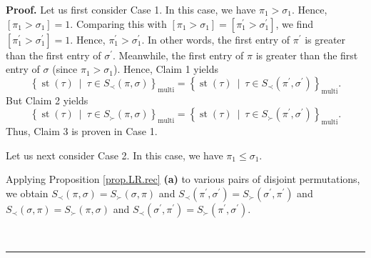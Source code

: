 \documentclass[numbers=enddot,12pt,final,onecolumn,notitlepage]{scrartcl}%
\theoremstyle{definition}
\newenvironment{proof}[1][Proof]{\noindent\textbf{#1.} }{\ \rule{0.5em}{0.5em}}
\begin{document}
\begin{proof}
Let us first consider Case 1. In this case, we have $\pi_{1}>\sigma_{1}$.
Hence, $\left[  \pi_{1}>\sigma_{1}\right]  =1$. Comparing this with $\left[
\pi_{1}>\sigma_{1}\right]  =\left[  \pi_{1}^{\prime}>\sigma_{1}^{\prime
}\right]  $, we find $\left[  \pi_{1}^{\prime}>\sigma_{1}^{\prime}\right]
=1$. Hence, $\pi_{1}^{\prime}>\sigma_{1}^{\prime}$. In other words, the first
entry of $\pi^{\prime}$ is greater than the first entry of $\sigma^{\prime}$.
Meanwhile, the first entry of $\pi$ is greater than the first entry of
$\sigma$ (since $\pi_{1}>\sigma_{1}$). Hence, Claim 1 yields%
\[
\left\{  \operatorname*{st}\left(  \tau\right)  \ \mid\ \tau\in S_{\prec
}\left(  \pi,\sigma\right)  \right\}  _{\operatorname*{multi}}=\left\{
\operatorname*{st}\left(  \tau\right)  \ \mid\ \tau\in S_{\prec}\left(
\pi^{\prime},\sigma^{\prime}\right)  \right\}  _{\operatorname*{multi}}.
\]
But Claim 2 yields%
\[
\left\{  \operatorname*{st}\left(  \tau\right)  \ \mid\ \tau\in S_{\succ
}\left(  \pi,\sigma\right)  \right\}  _{\operatorname*{multi}}=\left\{
\operatorname*{st}\left(  \tau\right)  \ \mid\ \tau\in S_{\succ}\left(
\pi^{\prime},\sigma^{\prime}\right)  \right\}  _{\operatorname*{multi}}.
\]
Thus, Claim 3 is proven in Case 1.

Let us next consider Case 2. In this case, we have $\pi_{1}\leq\sigma_{1}$.

Applying Proposition \ref{prop.LR.rec} \textbf{(a)} to various pairs of
disjoint permutations, we obtain $S_{\prec}\left(  \pi,\sigma\right)
=S_{\succ}\left(  \sigma,\pi\right)  $ and $S_{\prec}\left(  \pi^{\prime
},\sigma^{\prime}\right)  =S_{\succ}\left(  \sigma^{\prime},\pi^{\prime
}\right)  $ and $S_{\prec}\left(  \sigma,\pi\right)  =S_{\succ}\left(
\pi,\sigma\right)  $ and $S_{\prec}\left(  \sigma^{\prime},\pi^{\prime
}\right)  =S_{\succ}\left(  \pi^{\prime},\sigma^{\prime}\right)  $.


\end{proof}
\end{document}
